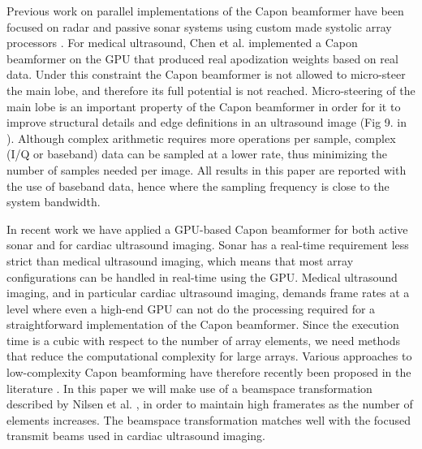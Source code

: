 \documentclass[journal]{IEEEtran}
\begin{document}
Previous work on parallel implementations of the Capon beamformer have been focused on radar and passive sonar systems using custom made systolic array processors \cite{McWhirter1989, Moonen1993, Sinha2002}. For medical ultrasound, Chen et al. \cite{Chen2011a, Chen2011, Chen} implemented a Capon beamformer on the GPU that produced real apodization weights based on real data. Under this constraint the Capon beamformer is not allowed to micro-steer the main lobe, and therefore its full potential is not reached. Micro-steering of the main lobe is an important property of the Capon beamformer in order for it to improve structural details and edge definitions in an ultrasound image (Fig 9. in \cite{Synnevag2009}). Although complex arithmetic requires more operations per sample, complex (I/Q or baseband) data can be sampled at a lower rate, thus minimizing the number of samples needed per image. All results in this paper are reported with the use of baseband data, hence where the sampling frequency is close to the system bandwidth. 


In recent work \cite{asen2012, Buskenes} we have applied a GPU-based Capon beamformer for both active sonar and for cardiac ultrasound imaging. Sonar has a real-time requirement less strict than medical ultrasound imaging, which means that most array configurations can be handled in real-time using the GPU. Medical ultrasound imaging, and in particular cardiac ultrasound imaging, demands frame rates at a level where even a high-end GPU can not do the processing required for a straightforward implementation of the Capon beamformer. Since the execution time is a cubic with respect to the number of array elements, we need methods that reduce the computational complexity for large arrays. Various approaches to low-complexity Capon beamforming have therefore recently been proposed in the literature \cite{Synnevag2011, Asl2012, Jensen2012, Kim}. In this paper we will make use of a beamspace transformation described by Nilsen et al. \cite{Nilsen2009}, in order to maintain high framerates as the number of elements increases. The beamspace transformation matches well with the focused transmit beams used in cardiac ultrasound imaging. 
\end{document}
